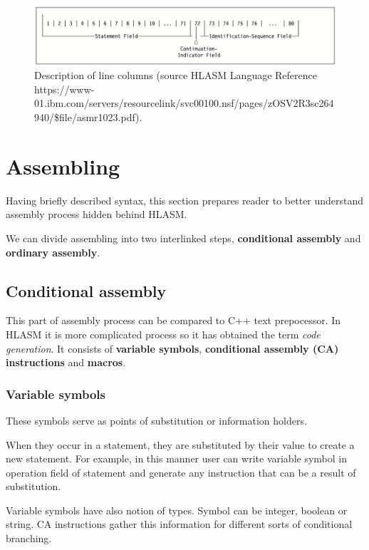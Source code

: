 \begin{figure}
	\includegraphics[width=\textwidth]{img/line}
	\caption{Description of line columns (source HLASM Language Reference https://www-01.ibm.com/servers/resourcelink/\-svc00100.nsf/\-pages/\-zOSV2R3sc264940/\-\$file/\-asmr1023.pdf).}
	\label{fig01:line}
\end{figure}


\section{Assembling}

Having briefly described syntax, this section prepares reader to better understand assembly process hidden behind HLASM. 

We can divide assembling into two interlinked steps, \textbf{conditional assembly} and \textbf{ordinary assembly}.

\subsection{Conditional assembly}

This part of assembly process can be compared to C++ text prepocessor. In HLASM it is more complicated process so it has obtained the term \textit{code generation}. It consists of \textbf{variable symbols}, \textbf{conditional assembly (CA) instructions} and \textbf{macros}. 


\subsubsection{Variable symbols}

These symbols serve as points of substitution or information holders. 

When they occur in a statement, they are substituted by their value to create a new statement. For example, in this manner user can write variable symbol in operation field of statement and generate any instruction that can be a result of substitution.

Variable symbols have also notion of types. Symbol can be integer, boolean or string. CA instructions gather this information for different sorts of conditional branching.

